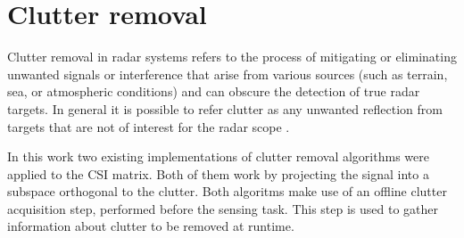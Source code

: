 \section{Clutter removal}
\label{sec:clutter_removal}

	Clutter removal in radar systems refers to the process of mitigating or eliminating unwanted signals or interference that arise from various sources (such as terrain, sea, or atmospheric conditions) and can obscure the detection of true radar targets.
	In general it is possible to refer clutter as any unwanted reflection from targets that are not of interest for the radar scope \cite{Richards_Scheer_Holm_2010}.
	
	In this work two existing implementations of clutter removal algorithms were applied to the CSI matrix.
	Both of them work by projecting the signal into a subspace orthogonal to the clutter.
	Both algoritms make use of an offline clutter acquisition step, performed before the sensing task. This step is used to gather information about clutter to be removed at runtime.
